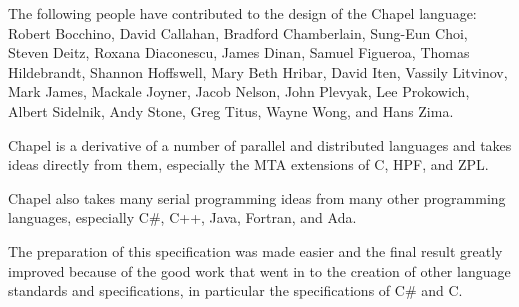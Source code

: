 \label{Acknowledgments}

The following people have contributed to the design of the Chapel
language:
Robert Bocchino,
David Callahan,
Bradford Chamberlain,
Sung-Eun Choi,
Steven Deitz,
Roxana Diaconescu,
James Dinan,
Samuel Figueroa,
Thomas Hildebrandt,
Shannon Hoffswell,
Mary Beth Hribar,
David Iten,
Vassily Litvinov,
Mark James,
Mackale Joyner,
Jacob Nelson,
John Plevyak,
Lee Prokowich,
Albert Sidelnik,
Andy Stone,
Greg Titus,
Wayne Wong,
and Hans Zima.

Chapel is a derivative of a number of parallel and distributed
languages and takes ideas directly from them, especially the MTA
extensions of C, HPF, and ZPL.

Chapel also takes many serial programming ideas from many other
programming languages, especially C\#, C++, Java, Fortran, and Ada.

The preparation of this specification was made easier and the final
result greatly improved because of the good work that went in to the
creation of other language standards and specifications, in particular
the specifications of C\# and C.
